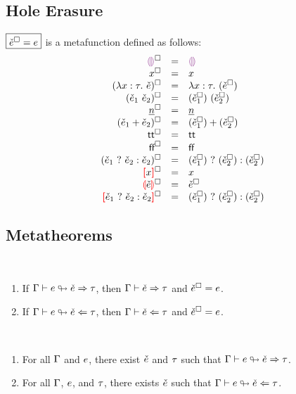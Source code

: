 \documentclass{article}
\begin{document}
\subsection{Hole Erasure}
$\judgbox{\erasesTo{\ECMV}{\EMV}}$ is a metafunction defined as follows:
%
\newcommand{\erasesToRow}[2]{\erase{#1} & = & #2}
\[\begin{array}{rcl}
  \erasesToRow{\ECEHole}{\EEHole} \\
  \erasesToRow{x}{x} \\
  \erasesToRow{(\ECLam{x}{\TMV}{\ECMV})}{\ELam{x}{\TMV}{(\erase{\ECMV})}} \\
  \erasesToRow{(\ECAp{\ECMV_1}{\ECMV_2})}{\EAp{(\erase{\ECMV_1})}{(\erase{\ECMV_2})}} \\
  \erasesToRow{\ECIntMV}{\EIntMV} \\
  \erasesToRow{(\ECPlus{\ECMV_1}{\ECMV_2})}{\EPlus{(\erase{\ECMV_1})}{(\erase{\ECMV_2})}} \\
  \erasesToRow{\ECTrue}{\ETrue} \\
  \erasesToRow{\ECFalse}{\EFalse} \\
  \erasesToRow{(\ECIf{\ECMV_1}{\ECMV_2}{\ECMV_3})}{\EIf{(\erase{\ECMV_1})}{(\erase{\ECMV_2})}{(\erase{\ECMV_3})}} \\
  \erasesToRow{\ECUnbound{x}}{x} \\
  \erasesToRow{\ECInconType{\ECMV}}{\erase{\ECMV}} \\
  \erasesToRow{\ECInconBr{\ECMV_1}{\ECMV_2}{\ECMV_3}}{\EIf{(\erase{\ECMV_1})}{(\erase{\ECMV_2})}{(\erase{\ECMV_3})}} \\
\end{array}\]

\subsection{Metatheorems}
\begin{theorem}[name=Hole Insertion] \
  \begin{enumerate}[label=(\arabic*)]
    \item If $\Gamma \vdash e \looparrowright \check{e} \Rightarrow \tau$, then $\Gamma \vdash \check{e} \Rightarrow \tau$ and
      $\check{e}^{\square} = e$. 
    \item If $\Gamma \vdash e \looparrowright \check{e} \Leftarrow \tau$, then $\Gamma \vdash \check{e} \Leftarrow \tau$ and
      $\check{e}^{\square} = e$.
  \end{enumerate}
\end{theorem}

\begin{theorem}[name=Totality] \
  \begin{enumerate}[label=(\arabic*)]
    \item For all $\Gamma$ and $e$, there exist $\check{e}$ and $\tau$ such that
      $\Gamma \vdash e \looparrowright \check{e} \Rightarrow \tau$. 
    \item For all $\Gamma$, $e$, and $\tau$, there exists $\check{e}$ such that
      $\Gamma \vdash e \looparrowright \check{e} \Leftarrow \tau$.
  \end{enumerate}
\end{theorem}
\end{document}
